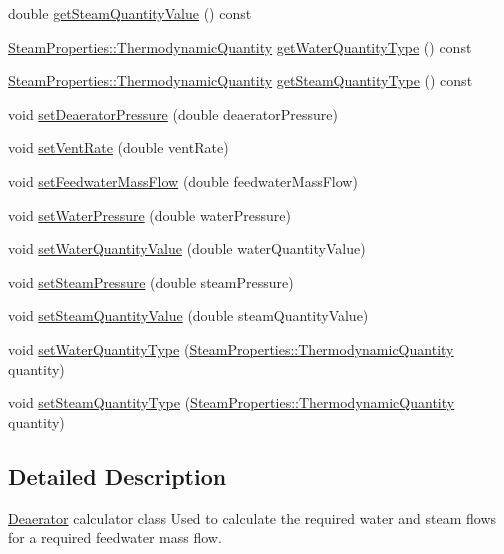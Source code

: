 \begin{DoxyCompactItemize}
double \hyperlink{class_deaerator_a5473feedca64e7c44143d422ed3e2401}{get\+Steam\+Quantity\+Value} () const
\item 
\hyperlink{class_steam_properties_ae0294bedf7d178c2d8fb6aed0f62fbff}{Steam\+Properties\+::\+Thermodynamic\+Quantity} \hyperlink{class_deaerator_a414282f81906e09a28bc75cf51659ec2}{get\+Water\+Quantity\+Type} () const
\item 
\hyperlink{class_steam_properties_ae0294bedf7d178c2d8fb6aed0f62fbff}{Steam\+Properties\+::\+Thermodynamic\+Quantity} \hyperlink{class_deaerator_a18abbdc5ec78f71e1d2495b0c64c77ec}{get\+Steam\+Quantity\+Type} () const
\item 
void \hyperlink{class_deaerator_a5b20d3aba98b21928cce70b45e843ff3}{set\+Deaerator\+Pressure} (double deaerator\+Pressure)
\item 
void \hyperlink{class_deaerator_a11e71194f58763a57ec0f7d05a21782d}{set\+Vent\+Rate} (double vent\+Rate)
\item 
void \hyperlink{class_deaerator_ada95cb2557bc43602d7bcefbad66c853}{set\+Feedwater\+Mass\+Flow} (double feedwater\+Mass\+Flow)
\item 
void \hyperlink{class_deaerator_ae23f64c6983daed388a73c033a15e176}{set\+Water\+Pressure} (double water\+Pressure)
\item 
void \hyperlink{class_deaerator_ac31cf2deb8bf30ee6921d1d9f8281eb8}{set\+Water\+Quantity\+Value} (double water\+Quantity\+Value)
\item 
void \hyperlink{class_deaerator_a5936221e68b5ba3245f0adabed74e6d7}{set\+Steam\+Pressure} (double steam\+Pressure)
\item 
void \hyperlink{class_deaerator_a101399a8b66c3ff1fecf884fd1b1373d}{set\+Steam\+Quantity\+Value} (double steam\+Quantity\+Value)
\item 
void \hyperlink{class_deaerator_ac60ad3d6650ed6c7783d18833bb7e3dd}{set\+Water\+Quantity\+Type} (\hyperlink{class_steam_properties_ae0294bedf7d178c2d8fb6aed0f62fbff}{Steam\+Properties\+::\+Thermodynamic\+Quantity} quantity)
\item 
void \hyperlink{class_deaerator_a1aa3b3de064d148479af9576e717b6c2}{set\+Steam\+Quantity\+Type} (\hyperlink{class_steam_properties_ae0294bedf7d178c2d8fb6aed0f62fbff}{Steam\+Properties\+::\+Thermodynamic\+Quantity} quantity)
\end{DoxyCompactItemize}


\subsection{Detailed Description}
\hyperlink{class_deaerator}{Deaerator} calculator class Used to calculate the required water and steam flows for a required feedwater mass flow. 

